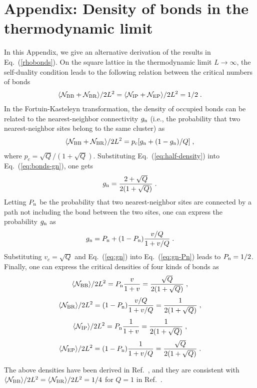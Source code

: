 \documentclass[aps,pre,twocolumn,superscriptaddress,longbibliography,floatfix]{revtex4-2}
\begin{document}
\appendix
\section*{Appendix: Density of bonds in the thermodynamic limit}
In this Appendix, we give an alternative derivation of the results in Eq.~(\ref{rhobonds}).
On the square lattice in the thermodynamic limit $L \rightarrow \infty$, the self-duality condition leads to the following relation between the critical numbers of bonds
\begin{align}
    \langle\mathcal{N}_{\rm BB} + \mathcal{N}_{\rm BR} \rangle/2L^2 = \langle\mathcal{N}_{\rm IP} + \mathcal{N}_{\rm EP} \rangle/2L^2 = 1/2 \;.
\label{eq:half-density}
\end{align}
In the Fortuin-Kasteleyn transformation, the density of occupied bonds can be related to the nearest-neighbor connectivity $g_{\rm n}$ (i.e., the probability that
two nearest-neighbor sites belong to the same cluster) as~\cite{Hu2014}
\begin{align}
    \langle\mathcal{N}_{\rm BB} + \mathcal{N}_{\rm BR} \rangle/2L^2 = p_c [g_{\rm n} + (1-g_{\rm n})/Q] \;,
\label{eq:bonds-gn}
\end{align}
where $p_c = \sqrt{Q}/(1+\sqrt{Q})$.
Substituting Eq.~(\ref{eq:half-density}) into Eq.~(\ref{eq:bonds-gn}), one gets~\cite{Hu2014}
\begin{align}
    g_{\rm n} = \frac{2+\sqrt{Q}}{2(1+\sqrt{Q})} \;.
\label{eq:gn}
\end{align}
Letting $P_{\rm n}$ be the probability that two nearest-neighbor sites are connected by a path not including the bond between the two sites, 
one can express the probability $g_{\rm n}$ as
\begin{align}
    g_{\rm n} = P_{\rm n} + (1-P_{\rm n}) \frac{v/Q}{1+v/Q} \;.
\label{eq:gn-Pn}
\end{align}
Substituting $v_c=\sqrt{Q}$ and Eq.~(\ref{eq:gn}) into Eq.~(\ref{eq:gn-Pn}) leads to $P_{\rm n}=1/2$.
Finally, one can express the critical densities of four kinds of bonds as
\begin{align}
    \langle\mathcal{N}_{\rm BB} \rangle/2L^2 = P_{\rm n} \frac{{v}}{1+{v}} = \frac{\sqrt{Q}}{2(1+\sqrt{Q})} \;,
\end{align}
\begin{align}
    \langle\mathcal{N}_{\rm BR} \rangle/2L^2 = (1-P_{\rm n}) \frac{{v}/Q}{1+{v}/Q} =  \frac{{1}}{2(1+\sqrt{Q})} \;,
\end{align}
\begin{align}
    \langle\mathcal{N}_{\rm IP} \rangle/2L^2 = P_{\rm n} \frac{1}{1+{v}} = \frac{{1}}{2(1+\sqrt{Q})} \;,
\end{align}
\begin{align}
    \langle\mathcal{N}_{\rm EP} \rangle/2L^2 = (1-P_{\rm n}) \frac{1}{1+{v}/Q} = \frac{\sqrt{Q}}{2(1+\sqrt{Q})} \;.
\end{align}


The above densities have been derived in Ref.~\cite{Eren2016}, and they are consistent with $\langle\mathcal{N}_{\rm BB} \rangle/2L^2 = \langle\mathcal{N}_{\rm BR} \rangle/2L^2 = 1/4$ for $Q=1$ in Ref.~\cite{xu2014geometric}.




\end{document}
